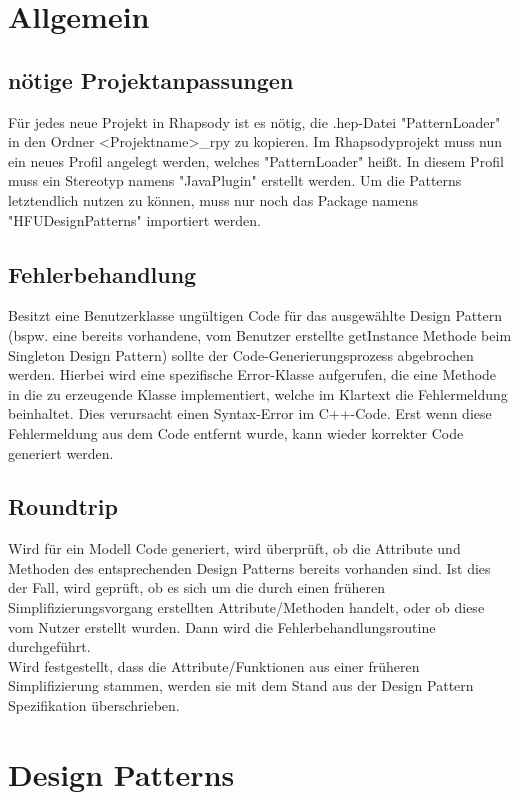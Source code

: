 \chapter{Allgemein}

\section{nötige Projektanpassungen}
Für jedes neue Projekt in Rhapsody ist es nötig, die .hep-Datei "PatternLoader" in den Ordner <Projektname>_rpy zu kopieren. Im Rhapsodyprojekt muss nun ein neues Profil angelegt werden, welches "PatternLoader" heißt. In diesem Profil muss ein Stereotyp namens "JavaPlugin" erstellt werden. Um die Patterns letztendlich nutzen zu können, muss nur noch das Package namens "HFUDesignPatterns" importiert werden.

\section{Fehlerbehandlung}
Besitzt eine Benutzerklasse ungültigen Code für das ausgewählte Design Pattern (bspw. eine 
bereits vorhandene, vom Benutzer erstellte getInstance Methode beim Singleton Design Pattern) 
sollte der Code-Generierungsprozess abgebrochen werden. Hierbei wird eine spezifische Error-Klasse aufgerufen, die eine Methode in die zu erzeugende Klasse implementiert, welche im Klartext die Fehlermeldung beinhaltet. Dies verursacht einen Syntax-Error im C++-Code. Erst wenn diese Fehlermeldung aus dem Code entfernt wurde, kann wieder korrekter Code generiert werden.

\section{Roundtrip}

Wird für ein Modell Code generiert, wird überprüft, ob die Attribute und Methoden des entsprechenden Design Patterns bereits vorhanden sind. Ist dies der Fall, wird geprüft, ob es sich um die durch einen früheren Simplifizierungsvorgang erstellten Attribute/Methoden handelt, oder ob diese vom Nutzer erstellt wurden. Dann wird die Fehlerbehandlungsroutine durchgeführt. \\
Wird festgestellt, dass die Attribute/Funktionen aus einer früheren Simplifizierung stammen, werden sie mit dem Stand aus der Design Pattern Spezifikation überschrieben.

\chapter{Design Patterns}


